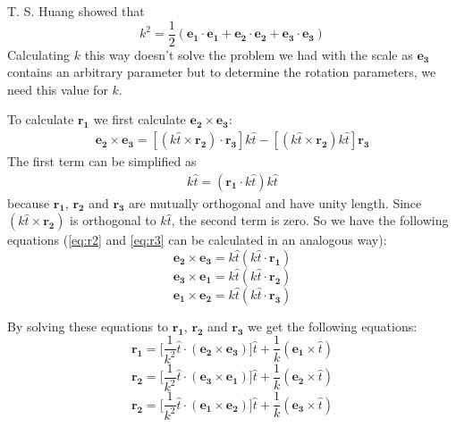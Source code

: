 T. S. Huang \cite{improc} showed that 
\begin{equation}
    k^2 = \frac{1}{2}(\boldsymbol{e_1}\cdot\boldsymbol{e_1} + \boldsymbol{e_2}\cdot\boldsymbol{e_2} + \boldsymbol{e_3}\cdot\boldsymbol{e_3})
\end{equation}
Calculating $k$ this way doesn't solve the problem we had with the scale as $\boldsymbol{e_3}$ contains an arbitrary parameter but to determine the rotation parameters, we need this value for $k$.\bigskip

To calculate $\boldsymbol{r_1}$ we first calculate $\boldsymbol{e_2 \times e_3}$:
\begin{align*}
    \boldsymbol{e_2} \times \boldsymbol{e_3} = [(k\hat{t}\times \boldsymbol{r_2})\cdot\boldsymbol{r_3}]k\hat{t} - [(k \hat{t} \times \boldsymbol{r_2})k \hat{t}]\boldsymbol{r_3}
\end{align*}
The first term can be simplified as 
\begin{align}
    [(\boldsymbol{r_2}\times\boldsymbol{r_3})\cdot k\hat{t}]k\hat{t} = (\boldsymbol{r_1}\cdot k\hat{t})k\hat{t}
\end{align}
because $\boldsymbol{r_1}$, $\boldsymbol{r_2}$ and $\boldsymbol{r_3}$ are mutually orthogonal and have unity length. Since $(k\hat{t}\times\boldsymbol{r_2})$ is orthogonal to $k\hat{t}$, the second term is zero. So we have the following equations (\autoref{eq:r2} and \autoref{eq:r3} can be calculated in an analogous way):
\begin{equation}
    \boldsymbol{e_2} \times \boldsymbol{e_3} = k\hat{t}(k\hat{t}\cdot\boldsymbol{r_1})
\end{equation}
\begin{equation}\label{eq:r2}
    \boldsymbol{e_3} \times \boldsymbol{e_1} = k\hat{t}(k\hat{t}\cdot\boldsymbol{r_2})
\end{equation}
\begin{equation}\label{eq:r3}
    \boldsymbol{e_1} \times \boldsymbol{e_2} = k\hat{t}(k\hat{t}\cdot\boldsymbol{r_3})
\end{equation}

By solving these equations to $\boldsymbol{r_1}$, $\boldsymbol{r_2}$ and $\boldsymbol{r_3}$ we get the following equations:
\begin{equation}
    \boldsymbol{r_1} = \biggl[\frac{1}{k^2}\hat{t}\cdot(\boldsymbol{e_2}\times\boldsymbol{e_3})\biggr]\hat{t}+\frac{1}{k}(\boldsymbol{e_1}\times\hat{t})
\end{equation}
\begin{equation}
    \boldsymbol{r_2} = \biggl[\frac{1}{k^2}\hat{t}\cdot(\boldsymbol{e_3}\times\boldsymbol{e_1})\biggr]\hat{t}+\frac{1}{k}(\boldsymbol{e_2}\times\hat{t})
\end{equation}
\begin{equation}
    \boldsymbol{r_2} = \biggl[\frac{1}{k^2}\hat{t}\cdot(\boldsymbol{e_1}\times\boldsymbol{e_2})\biggr]\hat{t}+\frac{1}{k}(\boldsymbol{e_3}\times\hat{t})
\end{equation}\bigskip

